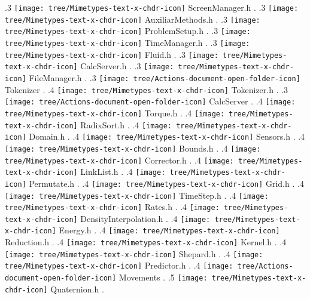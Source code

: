 {.3 { \texttt{[image: tree/Mimetypes-text-x-chdr-icon]} ScreenManager.h }.
.3 { \texttt{[image: tree/Mimetypes-text-x-chdr-icon]} AuxiliarMethods.h }.
.3 { \texttt{[image: tree/Mimetypes-text-x-chdr-icon]} ProblemSetup.h }.
.3 { \texttt{[image: tree/Mimetypes-text-x-chdr-icon]} TimeManager.h }.
.3 { \texttt{[image: tree/Mimetypes-text-x-chdr-icon]} Fluid.h }.
.3 { \texttt{[image: tree/Mimetypes-text-x-chdr-icon]} CalcServer.h }.
.3 { \texttt{[image: tree/Mimetypes-text-x-chdr-icon]} FileManager.h }.
.3 { \texttt{[image: tree/Actions-document-open-folder-icon]} Tokenizer }.
.4 { \texttt{[image: tree/Mimetypes-text-x-chdr-icon]} Tokenizer.h }.
.3 { \texttt{[image: tree/Actions-document-open-folder-icon]} CalcServer }.
.4 { \texttt{[image: tree/Mimetypes-text-x-chdr-icon]} Torque.h }.
.4 { \texttt{[image: tree/Mimetypes-text-x-chdr-icon]} RadixSort.h }.
.4 { \texttt{[image: tree/Mimetypes-text-x-chdr-icon]} Domain.h }.
.4 { \texttt{[image: tree/Mimetypes-text-x-chdr-icon]} Sensors.h }.
.4 { \texttt{[image: tree/Mimetypes-text-x-chdr-icon]} Bounds.h }.
.4 { \texttt{[image: tree/Mimetypes-text-x-chdr-icon]} Corrector.h }.
.4 { \texttt{[image: tree/Mimetypes-text-x-chdr-icon]} LinkList.h }.
.4 { \texttt{[image: tree/Mimetypes-text-x-chdr-icon]} Permutate.h }.
.4 { \texttt{[image: tree/Mimetypes-text-x-chdr-icon]} Grid.h }.
.4 { \texttt{[image: tree/Mimetypes-text-x-chdr-icon]} TimeStep.h }.
.4 { \texttt{[image: tree/Mimetypes-text-x-chdr-icon]} Rates.h }.
.4 { \texttt{[image: tree/Mimetypes-text-x-chdr-icon]} DensityInterpolation.h }.
.4 { \texttt{[image: tree/Mimetypes-text-x-chdr-icon]} Energy.h }.
.4 { \texttt{[image: tree/Mimetypes-text-x-chdr-icon]} Reduction.h }.
.4 { \texttt{[image: tree/Mimetypes-text-x-chdr-icon]} Kernel.h }.
.4 { \texttt{[image: tree/Mimetypes-text-x-chdr-icon]} Shepard.h }.
.4 { \texttt{[image: tree/Mimetypes-text-x-chdr-icon]} Predictor.h }.
.4 { \texttt{[image: tree/Actions-document-open-folder-icon]} Movements }.
.5 { \texttt{[image: tree/Mimetypes-text-x-chdr-icon]} Quaternion.h }.
}
